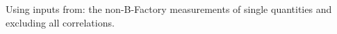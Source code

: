 \noindent Using inputs from: the non-B-Factory measurements of single quantities and excluding all correlations.

